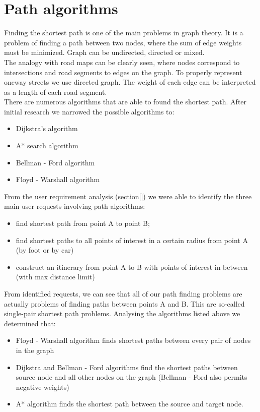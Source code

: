 \documentclass[reqno,openany,12pt]{amsbook}
\theoremstyle{definition}
\theoremstyle{remark}
\begin{document}
\chapter{Path algorithms}
Finding the shortest path is one of the main problems in graph theory. It is a problem of finding a path between two nodes, where the sum of edge weights must be minimized. Graph can be undirected, directed or mixed.\\
The analogy with road maps can be clearly seen, where nodes correspond to intersections and road segments to edges on the graph. To properly represent oneway streets we use directed graph. The weight of each edge can be interpreted as a length of each road segment.\\ There are numerous algorithms that are able to found the shortest path. After initial research we narrowed the possible algorithms to:
\begin{itemize}
\item Dijkstra's algorithm
\item A* search algorithm
\item Bellman - Ford algorithm
\item Floyd - Warshall algorithm
\end{itemize}

From the user requirement analysis (section[]) we were able to identify the three main user requests involving path algorithms:
\begin{itemize}
\item find shortest path from point A to point B;
\item find shortest paths to all points of interest in a certain radius from point A (by foot or by car)
\item construct an itinerary from point A to B with points of interest in between (with max distance limit)
\end{itemize}

From identified requests, we can see that all of our path finding problems are actually problems of finding paths between points A and B. This are so-called single-pair shortest path problems. Analysing the algorithms listed above we determined that:
\begin{itemize}
\item Floyd - Warshall algorithm finds shortest paths between every pair of nodes in the graph
\item Dijkstra and Bellman - Ford algorithms find the shortest paths between source node and all other nodes on the graph (Bellman - Ford also permits negative weights)
\item A* algorithm finds the shortest path between the source and target node. 
\end{itemize}
\end{document}
